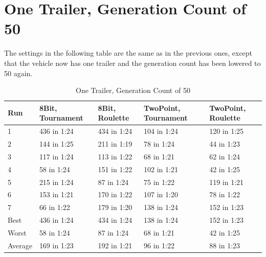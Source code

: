 \section{One Trailer, Generation Count of 50}
\label{sec:no_trailer_50}

The settings in the following table are the same as in the previous ones, except that the vehicle now has one trailer and the generation count has been lowered to 50 again.

\begin{table}\caption{One Trailer, Generation Count of 50}
\begin{center}
	\begin{tabular}{| l | l | l | p{3cm} | p{3cm}|}
		\hline
		Run 		& 8Bit, Tournament 	& 8Bit, Roulette 	& TwoPoint, Tournament 	& TwoPoint, Roulette	\\ \hline
		1				&	436 in 1:24				&	434 in 1:24			&	104 in 1:24						&	120 in 1:25					\\ \hline
		2				&	144 in 1:25				&	211 in 1:19			&	78 in 1:24						&	44 in 1:23					\\ \hline
		3				&	117 in 1:24				&	113 in 1:22			&	68 in 1:21						&	62 in 1:24					\\ \hline
		4				&	58 in 1:24				&	151 in 1:22			&	102 in 1:21						&	42 in 1:25					\\ \hline
		5				&	215 in 1:24				&	87 in 1:24			&	75 in 1:22						&	119 in 1:21					\\ \hline
		6				&	153 in 1:21				&	170 in 1:22			&	107 in 1:20						&	78 in 1:22					\\ \hline
		7				&	66 in 1:22				&	179 in 1:20			&	138 in 1:24						&	152 in 1:23					\\ \hline
		Best		&	436 in 1:24				&	434 in 1:24			&	138 in 1:24						&	152 in 1:23					\\ \hline
		Worst		&	58 in 1:24				&	87 in 1:24			&	68 in 1:21						& 42 in 1:25					\\ \hline
		Average	&	169 in 1:23				& 192 in 1:21			& 96 in 1:22						&	88 in 1:23					\\ \hline
		\hline
	\end{tabular}
\end{center}
\end{table}

